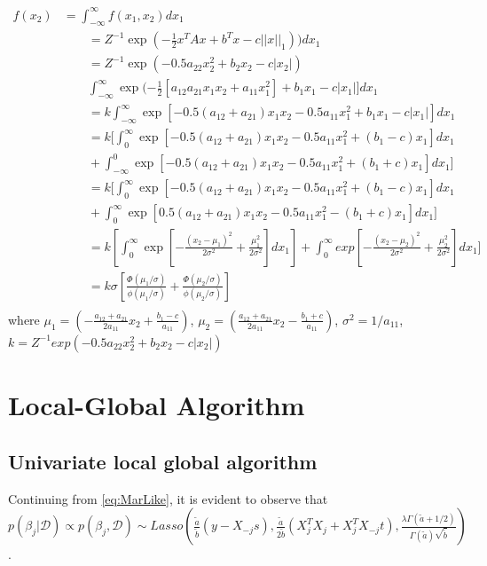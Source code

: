 $$
\begin{array}{rl}
	f(x_2)
	& =  \int_{-\infty}^{\infty} f(x_1,x_2)dx_1 \\
	& \qquad
	= Z^{-1}\exp(-\frac{1}{2}x^TAx + b^Tx - c||x||_1))dx_1 \\
	& \qquad
	= Z^{-1}\exp(-0.5 a_{22}x_2^2 + b_2x_2 - c|x_2|) \\
	& \qquad
	\int_{-\infty}^{\infty}\exp(-\frac{1}{2} [a_{12}a_{21}x_1x_2 + a_{11}x_1^2] + b_1x_1 - c|x_1|]dx_1\\
	& \qquad
	= k \int_{-\infty}^{\infty} \exp[-0.5(a_{12}+a_{21})x_1x_2 -0.5a_{11}x_1^2 + b_1x_1 - c|x_1|]dx_1\\
	& \qquad
	= k[ \int_{0}^{\infty} \exp[-0.5(a_{12}+a_{21})x_1x_2 - 0.5a_{11}x_1^2 + (b_1 - c)x_1 ]dx_1  \\
	& \qquad
	+\int_{-\infty}^{0}\exp[-0.5(a_{12}+a_{21})x_1x_2  - 0.5a_{11}x_1^2  + (b_1 + c)x_1]dx_1 ]\\
	& \qquad
	= k[ \int_{0}^{\infty} \exp[-0.5(a_{12}+a_{21})x_1x_2 - 0.5a_{11}x_1^2 + (b_1 - c)x_1 ]dx_1  \\
	& \qquad
	+\int_{0}^{\infty} \exp[0.5(a_{12}+a_{21})x_1x_2  - 0.5a_{11}x_1^2  - (b_1+c)x_1]dx_1 ]\\
	& \qquad
	= k[\int_{0}^{\infty} \exp[-\frac{(x_2-\mu_1)^2}{2\sigma^2} + \frac{\mu_1^2}{2\sigma^2}]dx_1] + \int_{0}^{\infty} exp[-\frac{(x_2-\mu_2)^2}{2\sigma^2} + \frac{\mu_2^2}{2\sigma^2}]dx_1] \\
	& \qquad
	= k \sigma[\frac{\Phi(\mu_1/\sigma)}{\phi(\mu_1/\sigma)} +
	\frac{\Phi(\mu_2/\sigma)}{\phi(\mu_2/\sigma)}]  \\
	
\end{array}
$$
where $\mu_1 = (-\frac{a_{12}+a_{21}}{2a_{11}}x_2 + \frac{b_1-c}{a_{11}}) $, $\mu_2 =(\frac{a_{12}+a_{21}}{2a_{11}}x_2 - \frac{b_1+c}{a_{11}}) $, $\sigma^2 = 1/a_{11}$, $k =  Z^{-1}exp(-0.5a_{22}x_2^2 + b_2x_2 - c|x_2|)$


\section{Local-Global Algorithm}
\subsection{Univariate local global algorithm}
Continuing from \autoref{eq:MarLike}, it is evident to observe that $p(\beta_j|\mathcal{D}) \propto p(\beta_j,\mathcal{D}) \sim Lasso(\frac{\tilde{a}}{\tilde{b}}(y - X_{-j}s), \frac{\tilde{a}}{2\tilde{b}}(X_j^TX_j+X_j^TX_{-j}t) , \frac{\lambda \Gamma(\tilde{a}+1/2)}{\Gamma(\tilde{a})\sqrt{\tilde{b}  }}) $.

